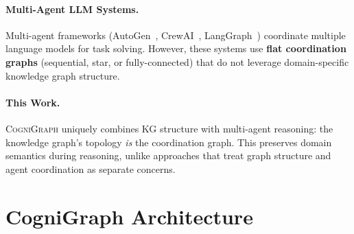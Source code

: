 \documentclass[a4paper,11pt]{article}
\theoremstyle{definition}
\newcommand{\cogni}{\textsc{CogniGraph}}
\begin{document}
\paragraph{Multi-Agent LLM Systems.}
Multi-agent frameworks (AutoGen~\cite{autogen2023}, CrewAI~\cite{crewai2024}, LangGraph~\cite{langgraph2024}) coordinate multiple language models for task solving.
However, these systems use \textbf{flat coordination graphs} (sequential, star, or fully-connected) that do not leverage domain-specific knowledge graph structure.

\paragraph{This Work.}
\cogni{} uniquely combines KG structure with multi-agent reasoning: the knowledge graph's topology \textit{is} the coordination graph.
This preserves domain semantics during reasoning, unlike approaches that treat graph structure and agent coordination as separate concerns.

\section{CogniGraph Architecture}
\label{sec:architecture}
\end{document}
